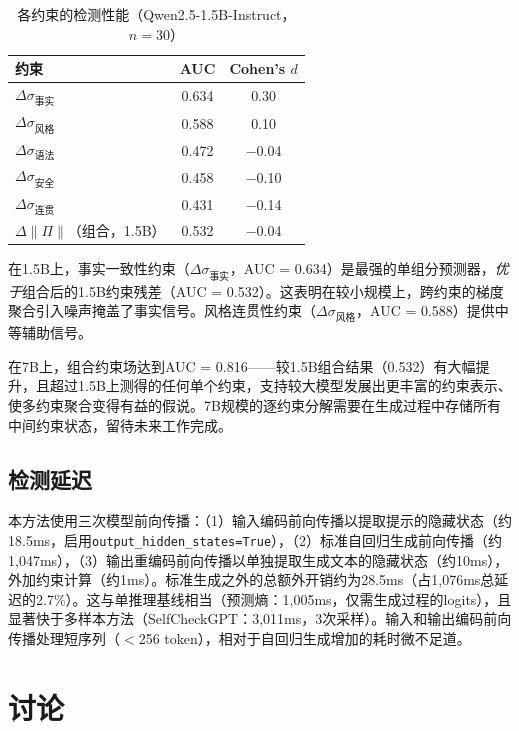 \documentclass[11pt]{ctexart}
\begin{document}
\begin{table}[h]
\centering
\caption{各约束的检测性能（Qwen2.5-1.5B-Instruct，$n = 30$）}
\label{tab:components}
\begin{tabular}{lcc}
\toprule
\textbf{约束} & \textbf{AUC} & \textbf{Cohen's $d$} \\
\midrule
$\Delta\sigma_{\text{事实}}$ & 0.634 & 0.30 \\
$\Delta\sigma_{\text{风格}}$ & 0.588 & 0.10 \\
$\Delta\sigma_{\text{语法}}$ & 0.472 & $-$0.04 \\
$\Delta\sigma_{\text{安全}}$ & 0.458 & $-$0.10 \\
$\Delta\sigma_{\text{连贯}}$ & 0.431 & $-$0.14 \\
\midrule
$\Delta\|\Pi\|$（组合，1.5B） & 0.532 & $-$0.04 \\
\bottomrule
\end{tabular}
\end{table}

在1.5B上，事实一致性约束（$\Delta\sigma_{\text{事实}}$，AUC = 0.634）是最强的单组分预测器，\textit{优于}组合后的1.5B约束残差（AUC = 0.532）。这表明在较小规模上，跨约束的梯度聚合引入噪声掩盖了事实信号。风格连贯性约束（$\Delta\sigma_{\text{风格}}$，AUC = 0.588）提供中等辅助信号。

在7B上，组合约束场达到AUC = 0.816——较1.5B组合结果（0.532）有大幅提升，且超过1.5B上测得的任何单个约束，支持较大模型发展出更丰富的约束表示、使多约束聚合变得有益的假说。7B规模的逐约束分解需要在生成过程中存储所有中间约束状态，留待未来工作完成。

\subsection{检测延迟}
\label{sec:latency-cn}

本方法使用三次模型前向传播：（1）输入编码前向传播以提取提示的隐藏状态（约18.5ms，启用\texttt{output\_hidden\_states=True}），（2）标准自回归生成前向传播（约1,047ms），（3）输出重编码前向传播以单独提取生成文本的隐藏状态（约10ms），外加约束计算（约1ms）。标准生成之外的总额外开销约为28.5ms（占1,076ms总延迟的2.7\%）。这与单推理基线相当（预测熵：1,005ms，仅需生成过程的logits），且显著快于多样本方法（SelfCheckGPT：3,011ms，3次采样）。输入和输出编码前向传播处理短序列（$<$256 token），相对于自回归生成增加的耗时微不足道。

\section{讨论}
\end{document}
